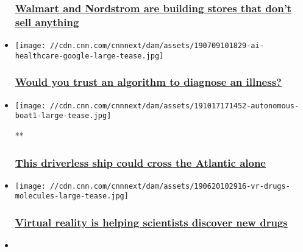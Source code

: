 \begin{itemize}
{  \subsubsection{\texorpdfstring{\href{/2019/07/27/business/nordstrom-local-walmart-pickup-point/index.html}{Walmart
  and Nordstrom are building stores that don't sell
  anything}}{Walmart and Nordstrom are building stores that don't sell anything}}\label{walmart-and-nordstrom-are-building-stores-that-dont-sell-anything}}
\item
  \href{/2019/07/15/business/artificial-intelligence-healthcare/index.html}{}

  \texttt{[image: //cdn.cnn.com/cnnnext/dam/assets/190709101829-ai-healthcare-google-large-tease.jpg]}

  \hypertarget{would-you-trust-an-algorithm-to-diagnose-an-illness-}{%
  \subsubsection{\texorpdfstring{\href{/2019/07/15/business/artificial-intelligence-healthcare/index.html}{Would
  you trust an algorithm to diagnose an illness?
  }}{Would you trust an algorithm to diagnose an illness? }}\label{would-you-trust-an-algorithm-to-diagnose-an-illness-}}
\item
  \href{/videos/business/2019/10/17/mayflower-autonomous-ship-biz-evolved-lon-orig.cnn}{}

  \texttt{[image: //cdn.cnn.com/cnnnext/dam/assets/191017171452-autonomous-boat1-large-tease.jpg]}

  **

  \hypertarget{this-driverless-ship-could-cross-the-atlantic-alone}{%
  \subsubsection{\texorpdfstring{\href{/videos/business/2019/10/17/mayflower-autonomous-ship-biz-evolved-lon-orig.cnn}{This
  driverless ship could cross the Atlantic
  alone}}{This driverless ship could cross the Atlantic alone}}\label{this-driverless-ship-could-cross-the-atlantic-alone}}
\item
  \href{/2019/06/25/business/virtual-reality-scientist-drug-discovery/index.html}{}

  \texttt{[image: //cdn.cnn.com/cnnnext/dam/assets/190620102916-vr-drugs-molecules-large-tease.jpg]}

  \hypertarget{virtual-reality-is-helping-scientists-discover-new-drugs}{%
  \subsubsection{\texorpdfstring{\href{/2019/06/25/business/virtual-reality-scientist-drug-discovery/index.html}{Virtual
  reality is helping scientists discover new
  drugs}}{Virtual reality is helping scientists discover new drugs}}\label{virtual-reality-is-helping-scientists-discover-new-drugs}}
\item
  \href{/2019/06/21/tech/alma-mental-health/index.html}{}


\end{itemize}
